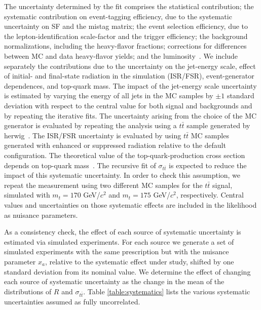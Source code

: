 \documentclass[aps,prd,twocolumn,superscriptaddress,showpacs]{revtex4}
\begin{document}
The uncertainty determined by the fit comprises the statistical contribution;  the systematic contribution on event-tagging efficiency, 
due to the systematic uncertainty on SF and the mistag matrix;  the event selection efficiency, 
due to the lepton-identification scale-factor and the trigger efficiency; 
 the background normalizations, 
including the heavy-flavor fractions; corrections for differences between MC and data heavy-flavor 
yields; and the luminosity~\cite{QCDback}.
We include separately the contributions due to the uncertainty on the jet-energy scale, 
effect of initial- and final-state radiation in the simulation (ISR/FSR), 
event-generator dependences, and top-quark mass.
The impact of the jet-energy scale uncertainty 
is estimated by varying the energy of all jets in the MC samples by  $\pm 1$ standard deviation 
with respect to the central value 
for both signal and backgrounds and by repeating the iterative fits.
The uncertainty arising from the choice of the MC generator is evaluated by repeating  the analysis
using a $t\bar t $ sample generated by {\sc herwig}~\cite{herwig}. 
The ISR/FSR uncertainty is evaluated by using $t\bar t $ MC samples generated with enhanced or suppressed 
radiation relative to the default configuration.
The theoretical value of the top-quark-production cross section depends on top-quark mass~\cite{masscrosscalc1}.
The recursive fit of $\sigma_{t\bar t}$ is expected to reduce 
the impact of this systematic uncertainty.
In order to check this assumption, we repeat the measurement 
using two different MC samples 
for the $t \bar t$ signal, simulated with $m_{t}=170$ GeV/$c^{2}$ and $m_{t}=175$ GeV/$c^{2}$, respectively. 
Central values and uncertainties on those systematic effects
 are included in the likelihood as nuisance parameters.

As a consistency check, the effect of each  source of systematic uncertainty is estimated via simulated 
experiments. For each source  we generate a set of simulated experiments with the same 
prescription but with the nuisance parameter $x_{a}$, relative to the 
systematic effect under study, shifted by one standard deviation from its nominal value.
 We determine the effect of changing each source of systematic uncertainty as 
 the change in the mean of the distributions of  $R$ 
and $\sigma_{t\bar{t}}$. 
Table \ref{table:systematics} lists the various systematic uncertainties assumed as fully uncorrelated.
\end{document}
